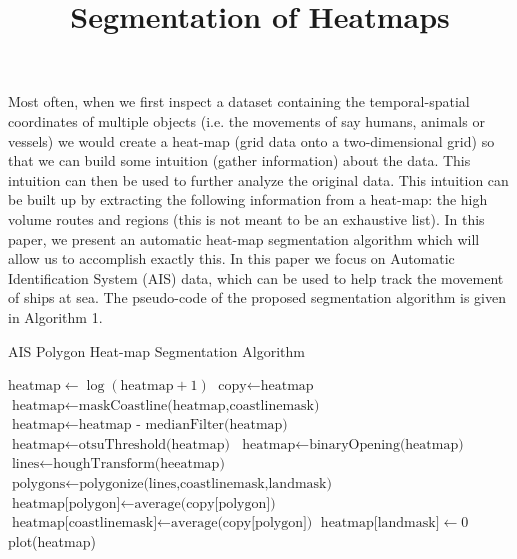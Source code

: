 \documentclass{article}
\title{Segmentation of Heatmaps}
\begin{document}
\maketitle
\begin{abstract}
\end{abstract}
Most often, when we first inspect a dataset containing the temporal-spatial coordinates of multiple objects (i.e. the movements of say humans, animals or vessels) we would create a heat-map (grid data onto a two-dimensional grid) so that we can build some intuition (gather information) about the data.
This intuition can then be used to further analyze the original data. This intuition can be built up by extracting the following information from a heat-map: the high volume 
routes and regions (this is not meant to be an exhaustive list). In this paper, we present an automatic heat-map segmentation algorithm which will allow us to accomplish exactly this.
In this paper we focus on Automatic Identification System (AIS) data, which can be used to help track the movement of ships at sea. The pseudo-code of the proposed segmentation algorithm is given in Algorithm 1. 
\begin{algorithm}
 \caption{AIS Polygon Heat-map Segmentation Algorithm}\label{euclid}
 \begin{algorithmic}[1]
 \State $\textrm{heatmap} \gets \log(\textrm{heatmap}+1)$
 \State $\textrm{copy} \gets \textrm{heatmap}$
 \State $\textrm{heatmap} \gets \textrm{maskCoastline(heatmap,coastlinemask)}$
 \State $\textrm{heatmap} \gets \textrm{heatmap - medianFilter(heatmap)}$ 
 \State $\textrm{heatmap} \gets \textrm{otsuThreshold(heatmap)}$
 \State $\textrm{heatmap} \gets \textrm{binaryOpening(heatmap)}$
 \State $\textrm{lines} \gets \textrm{houghTransform(heeatmap)}$
 \State $\textrm{polygons} \gets \textrm{polygonize(lines,coastlinemask,landmask)}$
     \State $\textrm{heatmap[polygon]} \gets \textrm{average(copy[polygon])}$ 
 \EndFor
 \State $\textrm{heatmap[coastlinemask]} \gets \textrm{average(copy[polygon])}$
 \State $\textrm{heatmap[landmask]} \gets 0$
 \State plot(heatmap)
 
 \EndProcedure
 \end{algorithmic}
 \end{algorithm}
\end{document}
